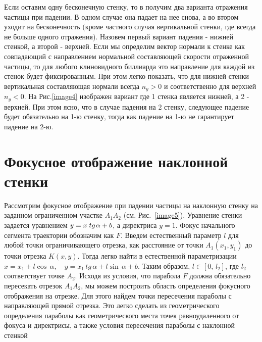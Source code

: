 \documentclass[a4paper]{article}
\begin{document}
 Если оставим одну бесконечную стенку, то в получим два варианта отражения частицы при падении. В одном случае она  падает на нее снова, а во втором уходит на бесконечность (кроме частного случая вертикальной стенки, где всегда не больше одного отражения).
 Назовем первый вариант падения - нижней стенкой, а второй - верхней. Если мы определим вектор нормали к стенке как совпадающий с направлением нормальной составляющей скорости отраженной частицы, то для любого клиновидного биллиарда это направление для каждой из стенок будет фиксированным. При этом легко показать, что для нижней стенки вертикальная составляющая нормали всегда $n_y>0$ и соответственно для верхней $n_y<0$. На  Рис.\ref{image4} изображен вариант где 1 стенка является нижней, а 2 - верхней. При этом ясно, что в случае падения на 2 стенку, следующее падение будет обязательно на 1-ю стенку, тогда как падение на 1-ю не гарантирует падение на 2-ю.


\section{Фокусное отображение наклонной стенки}

Рассмотрим фокусное отображение при падении частицы на наклонную стенку на заданном ограниченном участке $A_{1} A_{2} $ (см. Рис.~\ref{image5}). Уравнение стенки задается уравнением $y=x\; tg{\kern 1pt} \alpha +b$, а директриса $y=1$. Фокус начального сегмента траектории обозначим как $F$. Введем естественный параметр $l$ для любой точки ограничивающего отрезка, как расстояние от точки $A_{1} \left(x_{1} ,y_{1} \right)$ до точки отрезка $K\left(x,y\right)$. Тогда легко найти в естественной параметризации $x=x_{1} +l\cos \, \alpha ,\quad y=x_{1} \, tg\, \alpha +l\sin \, \alpha +b$. Таким образом, $l\in \left[0,\, l_{2} \right]$, где $l_{2} $ соответствует точке $A_{2} $. Исходя из условия, что парабола $F$ должна обязательно пересекать отрезок $A_{1} A_{2} $, мы можем построить область определения фокусного отображения на отрезке. Для этого найдем точки пересечения параболы с направляющей прямой отрезка. Это легко сделать из геометрического определения параболы как геометрического места точек равноудаленного от фокуса и директрисы, а также условия пересечения параболы с наклонной стенкой
\end{document}
